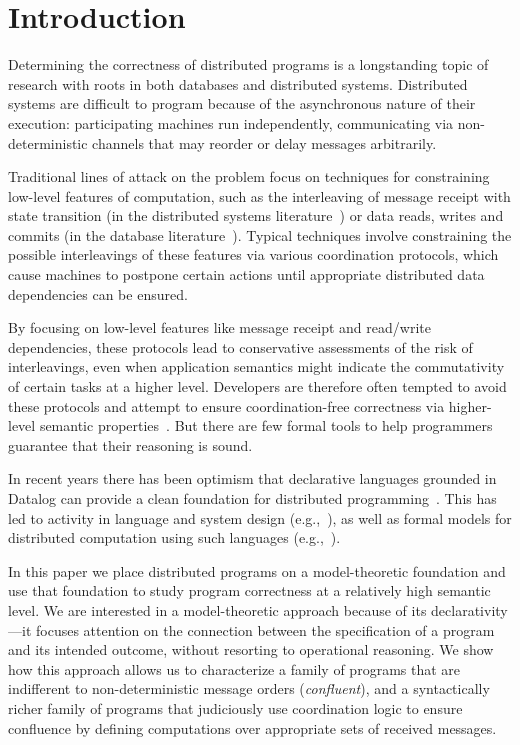 \section{Introduction}
Determining the correctness of distributed programs is a longstanding topic of
research with roots in both databases and distributed systems.  Distributed
systems are difficult to program because of the asynchronous nature of their
execution: participating machines run independently, communicating via
non-deterministic channels that may reorder or delay messages arbitrarily.

Traditional lines of attack on the problem focus on techniques for constraining
low-level features of computation, such as the interleaving of message receipt
with state transition (in the distributed systems literature~\cite{mullender})
or data reads, writes and commits (in the database literature~\cite{valduriez}).
Typical techniques involve constraining the possible interleavings of these
features via various coordination protocols, which cause machines to postpone
certain actions until appropriate distributed data dependencies can be ensured.

By focusing on low-level features like message receipt and read/write
dependencies, these protocols lead to conservative assessments of the risk of
interleavings, even when application semantics might indicate the commutativity
of certain tasks at a higher level. Developers are therefore often tempted to
avoid these protocols and attempt to ensure coordination-free correctness via
higher-level semantic properties~\cite{quicksand}.  But there are few formal
tools to help programmers guarantee that their reasoning is sound.

In recent years there has been optimism that declarative languages grounded in
Datalog can provide a clean foundation for distributed
programming~\cite{declarative-imperative}.  This has led to activity in language
and system design (e.g.,~\cite{boom,Belaramani:2009,Chu:2007,Loo2009-CACM}), as well as formal
models for distributed computation using such
languages (e.g.,~\cite{relational-transducers,navarro-oper-sem,card-abstraction}).


In this paper we place distributed programs on a model-theoretic foundation and use that foundation to study program correctness at a relatively high semantic level.  We are interested in a model-theoretic approach because of its declarativity---it focuses attention on the connection between the specification of a program and its intended outcome, without resorting to operational reasoning.  We show how this approach allows us to characterize a family of programs that are indifferent to non-deterministic message orders (\emph{confluent}), and a syntactically richer family of programs that judiciously use coordination logic to ensure confluence by defining computations over appropriate sets of received messages.

